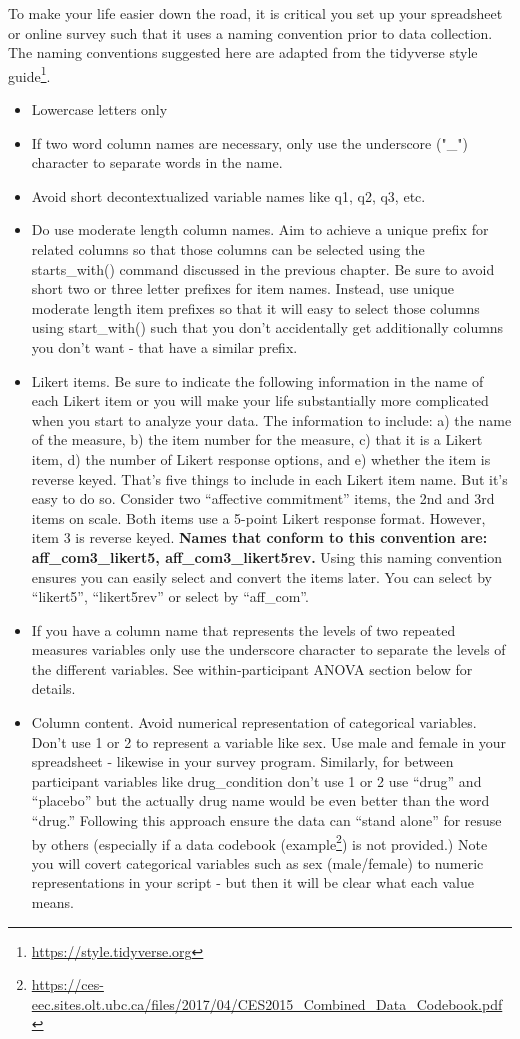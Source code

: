 \documentclass[
]{krantz}
\renewcommand{\href}[2]{#2\footnote{\url{#1}}}
\begin{document}
To make your life easier down the road, it is critical you set up your spreadsheet or online survey such that it uses a naming convention prior to data collection. The naming conventions suggested here are adapted from the tidyverse \href{https://style.tidyverse.org}{style guide}.

\begin{itemize}
\item
  Lowercase letters only
\item
  If two word column names are necessary, only use the underscore ("\_") character to separate words in the name.
\item
  Avoid short decontextualized variable names like q1, q2, q3, etc.
\item
  Do use moderate length column names. Aim to achieve a unique prefix for related columns so that those columns can be selected using the starts\_with() command discussed in the previous chapter. Be sure to avoid short two or three letter prefixes for item names. Instead, use unique moderate length item prefixes so that it will easy to select those columns using start\_with() such that you don't accidentally get additionally columns you don't want - that have a similar prefix.
\item
  Likert items. Be sure to indicate the following information in the name of each Likert item or you will make your life substantially more complicated when you start to analyze your data. The information to include: a) the name of the measure, b) the item number for the measure, c) that it is a Likert item, d) the number of Likert response options, and e) whether the item is reverse keyed. That's five things to include in each Likert item name. But it's easy to do so. Consider two ``affective commitment'' items, the 2nd and 3rd items on scale. Both items use a 5-point Likert response format. However, item 3 is reverse keyed. \textbf{Names that conform to this convention are: aff\_com3\_likert5, aff\_com3\_likert5rev.} Using this naming convention ensures you can easily select and convert the items later. You can select by ``likert5'', ``likert5rev'' or select by ``aff\_com''.
\item
  If you have a column name that represents the levels of two repeated measures variables only use the underscore character to separate the levels of the different variables. See within-participant ANOVA section below for details.
\item
  Column content. Avoid numerical representation of categorical variables. Don't use 1 or 2 to represent a variable like sex. Use male and female in your spreadsheet - likewise in your survey program. Similarly, for between participant variables like drug\_condition don't use 1 or 2 use ``drug'' and ``placebo'' but the actually drug name would be even better than the word ``drug.'' Following this approach ensure the data can ``stand alone'' for resuse by others (especially if a data codebook (\href{https://ces-eec.sites.olt.ubc.ca/files/2017/04/CES2015_Combined_Data_Codebook.pdf}{example}) is not provided.) Note you will covert categorical variables such as sex (male/female) to numeric representations in your script - but then it will be clear what each value means.
\end{itemize}
\end{document}
